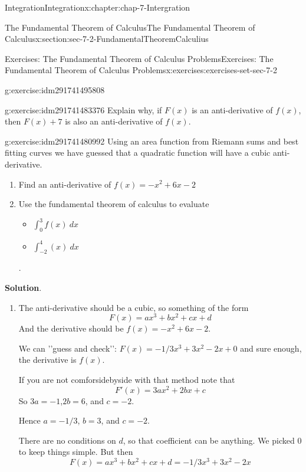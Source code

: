 \documentclass[oneside,10pt,]{book}
\numberwithin{equation}{section}
\begin{document}
\begin{chapterptx}{Integration}{}{Integration}{}{}{x:chapter:chap-7-Intergration}
\begin{sectionptx}{The Fundamental Theorem of Calculus}{}{The Fundamental Theorem of Calculus}{}{}{x:section:sec-7-2-FundamentalTheoremCalculius}
\begin{exercises-subsection}{Exercises: The Fundamental Theorem of Calculus Problems}{}{Exercises: The Fundamental Theorem of Calculus Problems}{}{}{x:exercises:exercises-set-sec-7-2}
\begin{divisionexercise}{5}{}{}{g:exercise:idm291741495808}
\begin{enumerate}[label=(\alph*)]
\end{enumerate}
\end{divisionexercise}%
\begin{divisionexercise}{6}{}{}{g:exercise:idm291741483376}%
Explain why, if \(F(x)\) is an anti-derivative of \(f(x)\), then \(F(x) + 7\) is also an anti-derivative of \(f(x)\).%
\end{divisionexercise}%
\begin{divisionexercise}{7}{}{}{g:exercise:idm291741480992}%
Using an area function from Riemann sums and best fitting curves we have guessed that a quadratic function will have a cubic anti-derivative.%
%
\begin{enumerate}[label=(\alph*)]
\item{}Find an anti-derivative of \(f(x)=-x^2+6x-2\)%
\item{}Use the fundamental theorem of calculus to evaluate%
\begin{itemize}[label=\textbullet]
\item{}\(\displaystyle \int_0^3 f(x)\ dx\)%
\item{}\(\displaystyle \int_{-2}^4 (x)\ dx\)%
\end{itemize}
.%
\end{enumerate}
\par\smallskip%
\noindent\textbf{Solution}.\hypertarget{g:solution:idm291741476576}{}\quad{}%
\begin{enumerate}[label=(\alph*)]
\item{}The anti-derivative should be a cubic, so something of the form%
%
\begin{equation*}
F(x)=ax^3+bx^2+cx+d
\end{equation*}
And the derivative should be \(f(x)= -x^2+6x-2\).%
\par
We can '{}'{}guess and check'{}'{}: \(F(x)=-1/3 x^3+3x^2-2x+0\) and sure enough, the derivative is \(f(x)\).%
\par
If you are not comforsidebyside with that method note that%
%
\begin{equation*}
F' (x)=3ax^2+2bx+c
\end{equation*}
So \(3a= -1\),\(2b=6\), and \(c=-2\).%
\par
Hence \(a= -1/3\),   \(b=3\), and \(c=-2\).%
\par
There are no conditions on \(d\), so that coefficient can be anything. We picked 0 to keep things simple. But then%
%
\begin{equation*}
F(x)=ax^3+bx^2+cx+d=-1/3 x^3+3x^2-2x
\end{equation*}

\end{enumerate}
\end{divisionexercise}
\end{exercises-subsection}
\end{sectionptx}
\end{chapterptx}
\end{document}

